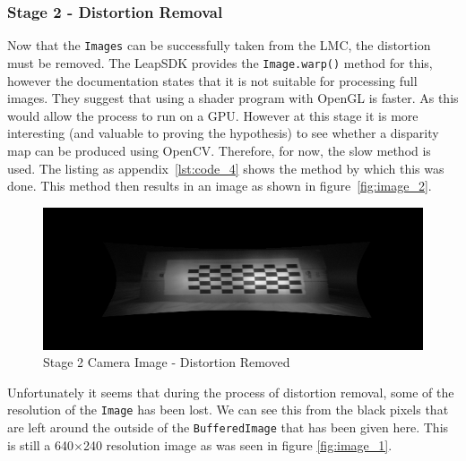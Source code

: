 \documentclass[11pt,oneside]{report}
\newcommand\code[1]{\texttt{#1}}
\begin{document}
		\subsubsection{Stage 2 - Distortion Removal}
		Now that the \code{Images} can be successfully taken from the LMC, the distortion must be removed.
		The LeapSDK provides the \code{Image.warp()} method for this, however the documentation states that it is not suitable for processing full images.
		They suggest that using a shader program with OpenGL is faster.
		As this would allow the process to run on a GPU.
		However at this stage it is more interesting (and valuable to proving the hypothesis) to see whether a disparity map can be produced using OpenCV.
		Therefore, for now, the slow method is used.
		The listing as appendix~\ref{lst:code_4} shows the method by which this was done.
		This method then results in an image as shown in figure~\ref{fig:image_2}.
		\begin{figure}
			\centering
    				\includegraphics[width=\textwidth]{2}
    				\caption{Stage 2 Camera Image - Distortion Removed \protect {\label{fig:image_2}}}

		\end{figure}	
		Unfortunately it seems that during the process of distortion removal, some of the resolution of the \code{Image} has been lost.
		We can see this from the black pixels that are left around the outside of the \code{BufferedImage} that has been given here.
		This is still a 640$\times$240 resolution image as was seen in figure \ref{fig:image_1}.
		
\end{document}
